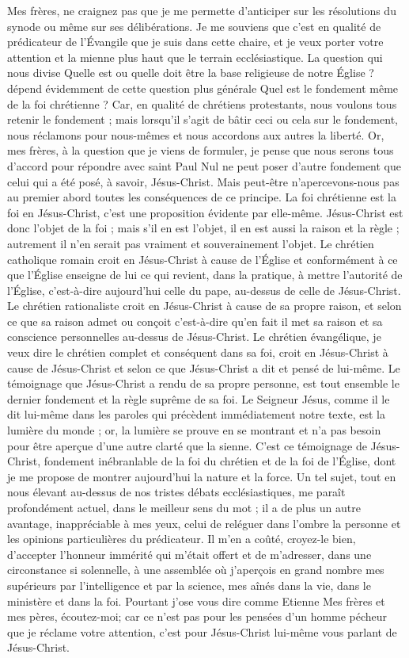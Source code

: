 Mes frères, ne craignez pas que je me permette d’anticiper sur les résolutions du synode ou même sur ses délibérations. Je me souviens que c’est en qualité de prédicateur de l’Évangile que je suis dans cette chaire, et je veux porter votre attention et la mienne plus haut que le terrain ecclésiastique. La question qui nous divise\frcolon{} \Og{} Quelle est ou quelle doit être la base religieuse de notre Église ?\Fg{} dépend évidemment de cette question plus générale\frcolon{} \Og{} Quel est le fondement même de la foi chrétienne ?\Fg{} Car, en qualité de chrétiens protestants, nous voulons tous retenir le fondement ; mais lorsqu’il s’agit de bâtir ceci ou cela sur le fondement, nous réclamons pour nous-mêmes et nous accordons aux autres la liberté. Or, mes frères, à la question que je viens de formuler, je pense que nous serons tous d’accord pour répondre avec saint Paul\frcolon{} \Og{} Nul ne peut poser d’autre fondement que celui qui a été posé, à savoir, Jésus-Christ.\Fg{} Mais peut-être n’apercevons-nous pas au premier abord toutes les conséquences de ce principe. La foi chrétienne est la foi en Jésus-Christ, c’est une proposition évidente par elle-même. Jésus-Christ est donc l’objet de la foi ; mais s’il en est l’objet, il en est aussi la raison et la règle ; autrement il n’en serait pas vraiment et souverainement l’objet. Le chrétien catholique romain croit en Jésus-Christ à cause de l’Église et conformément à ce que l’Église enseigne de lui\frcolon{} ce qui revient, dans la pratique, à mettre l’autorité de l’Église, c’est-à-dire aujourd’hui celle du pape, au-dessus de celle de Jésus-Christ. Le chrétien rationaliste croit en Jésus-Christ à cause de sa propre raison, et selon ce que sa raison admet ou conçoit\frcolon{} c’est-à-dire qu’en fait il met sa raison et sa conscience personnelles au-dessus de Jésus-Christ. Le chrétien évangélique, je veux dire le chrétien complet et conséquent dans sa foi, croit en Jésus-Christ à cause de Jésus-Christ et selon ce que Jésus-Christ a dit et pensé de lui-même. Le témoignage que Jésus-Christ a rendu de sa propre personne, est tout ensemble le dernier fondement et la règle suprême de sa foi. Le Seigneur Jésus, comme il le dit lui-même dans les paroles qui précèdent immédiatement notre texte, est la lumière du monde ; or, la lumière se prouve en se montrant et n’a pas besoin pour être aperçue d’une autre clarté que la sienne. C’est ce témoignage de Jésus-Christ, fondement inébranlable de la foi du chrétien et de la foi de l’Église, dont je me propose de montrer aujourd’hui la nature et la force. Un tel sujet, tout en nous élevant au-dessus de nos tristes débats ecclésiastiques, me paraît profondément actuel, dans le meilleur sens du mot ; il a de plus un autre avantage, inappréciable à mes yeux, celui de reléguer dans l’ombre la personne et les opinions particulières du prédicateur. Il m’en a coûté, croyez-le bien, d’accepter l’honneur immérité qui m’était offert et de m’adresser, dans une circonstance si solennelle, à une assemblée où j’aperçois en grand nombre mes supérieurs par l’intelligence et par la science, mes aînés dans la vie, dans le ministère et dans la foi. Pourtant j’ose vous dire comme Etienne\frcolon{} \Og{} Mes frères et mes pères, écoutez-moi\Fg{}; car ce n’est pas pour les pensées d’un homme pécheur que je réclame votre attention, c’est pour Jésus-Christ lui-même vous parlant de Jésus-Christ.


